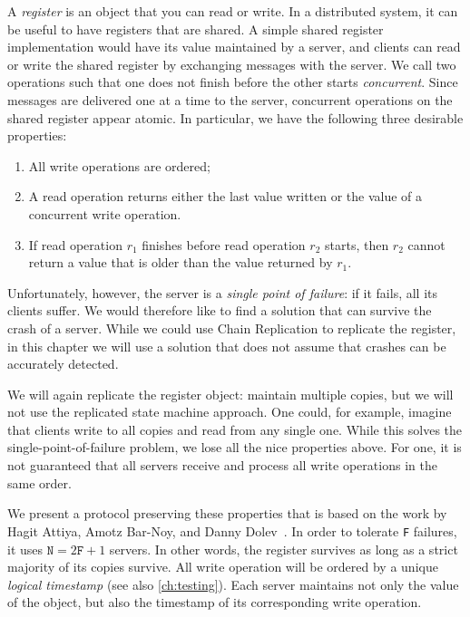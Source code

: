 \documentclass{report}
\begin{document}
A \emph{register} is an object that you can read or write.  In a distributed
system, it can be useful to have registers that are shared.
A simple shared register implementation
would have its value maintained by a server, and clients can read or write the
shared register by exchanging messages with the server.
We call two operations such that one does not finish before the other starts
\emph{concurrent}.
Since messages are delivered one at a time to the server,
concurrent operations on the shared register appear atomic.
In particular, we have the following three desirable properties:
\begin{enumerate}
\item All write operations are ordered;
\item A read operation returns either the last value written or the value of
a concurrent write operation.
\item If read operation $r_1$ finishes before read operation $r_2$ starts,
then $r_2$ cannot return a value that is older than the value returned
by $r_1$.
\end{enumerate}

%
Unfortunately, however, the server is a \emph{single point of failure}:
if it fails, all its clients suffer.
We would therefore like to find a solution that can survive the crash
of a server.
While we could use Chain Replication to replicate the register, in
this chapter we will use a solution that does not assume that
crashes can be accurately detected.

We will again replicate the register object: maintain multiple copies,
but we will not use the replicated state machine approach.
One could, for example, imagine that clients write to all copies and read
from any single one.
While this solves the single-point-of-failure problem, we lose all the
nice properties above.  For one, it is not guaranteed that all servers
receive and process all write operations in the same order.

%
We present a protocol preserving these properties that is based on the
work by Hagit Attiya, Amotz Bar-Noy, and Danny Dolev~\cite{ABD95}.
In order to tolerate \texttt{F} failures,
it uses $\mathtt{N} = 2\mathtt{F} + 1$ servers.
In other words, the register survives as long as a strict majority of
its copies survive.
All write operation will be ordered by a unique \emph{logical timestamp}
(see also \autoref{ch:testing}).
Each server maintains not only the value of the object, but also the
timestamp of its corresponding write operation.
\end{document}
